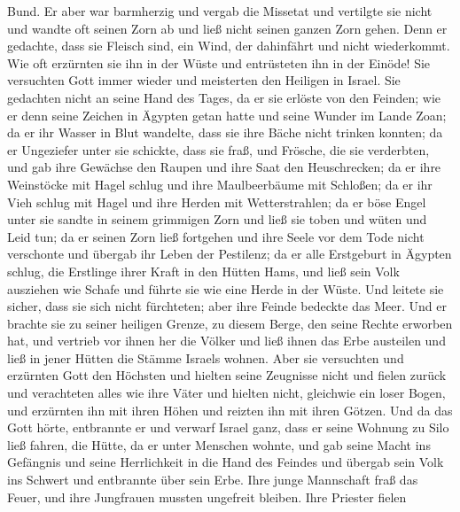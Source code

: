 Bund.  Er aber war barmherzig und vergab die Missetat und
vertilgte sie nicht und wandte oft seinen Zorn ab und ließ nicht seinen
ganzen Zorn gehen.  Denn er gedachte, dass sie Fleisch
sind, ein Wind, der dahinfährt und nicht wiederkommt.  Wie
oft erzürnten sie ihn in der Wüste und entrüsteten ihn in der Einöde!
 Sie versuchten Gott immer wieder und meisterten den
Heiligen in Israel.  Sie gedachten nicht an seine Hand des
Tages, da er sie erlöste von den Feinden;  wie er denn
seine Zeichen in Ägypten getan hatte und seine Wunder im Lande Zoan;
 da er ihr Wasser in Blut wandelte, dass sie ihre Bäche
nicht trinken konnten;  da er Ungeziefer unter sie
schickte, dass sie fraß, und Frösche, die sie verderbten, 
und gab ihre Gewächse den Raupen und ihre Saat den Heuschrecken;
 da er ihre Weinstöcke mit Hagel schlug und ihre
Maulbeerbäume mit Schloßen;  da er ihr Vieh schlug mit
Hagel und ihre Herden mit Wetterstrahlen;  da er böse Engel
unter sie sandte in seinem grimmigen Zorn und ließ sie toben und wüten
und Leid tun;  da er seinen Zorn ließ fortgehen und ihre
Seele vor dem Tode nicht verschonte und übergab ihr Leben der Pestilenz;
 da er alle Erstgeburt in Ägypten schlug, die Erstlinge
ihrer Kraft in den Hütten Hams,  und ließ sein Volk
ausziehen wie Schafe und führte sie wie eine Herde in der Wüste.
 Und leitete sie sicher, dass sie sich nicht fürchteten;
aber ihre Feinde bedeckte das Meer.  Und er brachte sie zu
seiner heiligen Grenze, zu diesem Berge, den seine Rechte erworben hat,
 und vertrieb vor ihnen her die Völker und ließ ihnen das
Erbe austeilen und ließ in jener Hütten die Stämme Israels wohnen.
 Aber sie versuchten und erzürnten Gott den Höchsten und
hielten seine Zeugnisse nicht  und fielen zurück und
verachteten alles wie ihre Väter und hielten nicht, gleichwie ein loser
Bogen,  und erzürnten ihn mit ihren Höhen und reizten ihn
mit ihren Götzen.  Und da das Gott hörte, entbrannte er und
verwarf Israel ganz,  dass er seine Wohnung zu Silo ließ
fahren, die Hütte, da er unter Menschen wohnte,  und gab
seine Macht ins Gefängnis und seine Herrlichkeit in die Hand des Feindes
 und übergab sein Volk ins Schwert und entbrannte über sein
Erbe.  Ihre junge Mannschaft fraß das Feuer, und ihre
Jungfrauen mussten ungefreit bleiben.  Ihre Priester fielen
